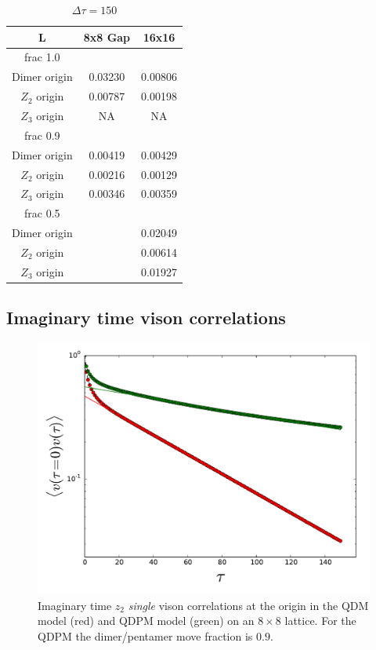 \documentclass[aps,floatfix,11pt,twocolumn]{revtex4-1}
\begin{document}
    \begin{table}[htpb]
        \centering
        \caption{$\Delta \tau = 150$}
        \label{tab:label}
        \begin{tabular}{c c c}
            \hline\hline
         L            & 8x8 Gap  & 16x16  \\ 
            \hline
         frac 1.0     &          & \\
            \hline
         Dimer origin &  0.03230 & 0.00806 \\
         $Z_2$ origin &  0.00787 & 0.00198  \\
         $Z_3$ origin &  NA      & NA \\
            \hline
         frac 0.9     &          & \\
            \hline
         Dimer origin &  0.00419 & 0.00429 \\
         $Z_2$ origin &  0.00216 & 0.00129  \\
         $Z_3$ origin &  0.00346 & 0.00359 \\
            \hline
         frac 0.5     &          & \\
            \hline
         Dimer origin &          & 0.02049 \\
         $Z_2$ origin &          & 0.00614  \\
         $Z_3$ origin &          & 0.01927  
        \end{tabular}
    \end{table}





    \subsection{Imaginary time vison correlations}
    \begin{figure}[htpb]
        \centering
        \includegraphics[width=0.8\linewidth]{z2_origin_vison_time_cor.pdf}
        \caption{Imaginary time $z_2$ \textit{single} vison correlations at the origin in the QDM model (red) and QDPM
        model (green) on an $8\times8$ lattice. For the QDPM the dimer/pentamer move fraction is $0.9$.}
        \label{fig:name}
    \end{figure}
\end{document}
